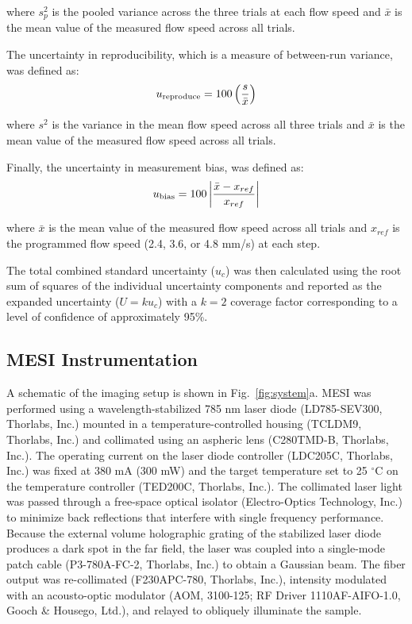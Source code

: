 \documentclass[12pt]{spieman}
\begin{document}
\begin{spacing}{2}
\noindent where $s_p^2$ is the pooled variance across the three trials at each flow speed and $\bar{x}$ is the mean value of the measured flow speed across all trials.

The uncertainty in reproducibility, which is a measure of between-run variance, was defined as:
%
\begin{equation}
    \label{eq:u_reproduce}
    u_\textnormal{reproduce} = 100\left(\frac{s}{\bar{x}}\right)
\end{equation}

\noindent where $s^2$ is the variance in the mean flow speed across all three trials and $\bar{x}$ is the mean value of the measured flow speed across all trials.

Finally, the uncertainty in measurement bias, was defined as:
%
\begin{equation}
    \label{eq:u_bias}
    u_\textnormal{bias} = 100 \left| \frac{\bar{x} - x_{ref}}{x_{ref}} \right|
\end{equation}

\noindent where $\bar{x}$ is the mean value of the measured flow speed across all trials and $x_{ref}$ is the programmed flow speed (2.4, 3.6, or 4.8 mm/s) at each step.

The total combined standard uncertainty ($u_c$) was then calculated using the root sum of squares of the individual uncertainty components and reported as the expanded uncertainty ($U=ku_c$) with a $k=2$ coverage factor corresponding to a level of confidence of approximately 95\%.


\subsection{MESI Instrumentation}

A schematic of the imaging setup is shown in Fig.~\ref{fig:system}a. MESI was performed \cite{Parthasarathy:2008el} using a wavelength-stabilized 785 nm laser diode (LD785-SEV300, Thorlabs, Inc.) mounted in a temperature-controlled housing (TCLDM9, Thorlabs, Inc.) and collimated using an aspheric lens (C280TMD-B, Thorlabs, Inc.). The operating current on the laser diode controller (LDC205C, Thorlabs, Inc.) was fixed at 380 mA (300 mW) and the target temperature set to 25 $^\circ$C on the temperature controller (TED200C, Thorlabs, Inc.). The collimated laser light was passed through a free-space optical isolator (Electro-Optics Technology, Inc.) to minimize back reflections that interfere with single frequency performance. Because the external volume holographic grating of the stabilized laser diode produces a dark spot in the far field, the laser was coupled into a single-mode patch cable (P3-780A-FC-2, Thorlabs, Inc.) to obtain a Gaussian beam. The fiber output was re-collimated (F230APC-780, Thorlabs, Inc.), intensity modulated with an acousto-optic modulator (AOM, 3100-125; RF Driver 1110AF-AIFO-1.0, Gooch \& Housego, Ltd.), and relayed to obliquely illuminate the sample.


\end{spacing}
\end{document}
